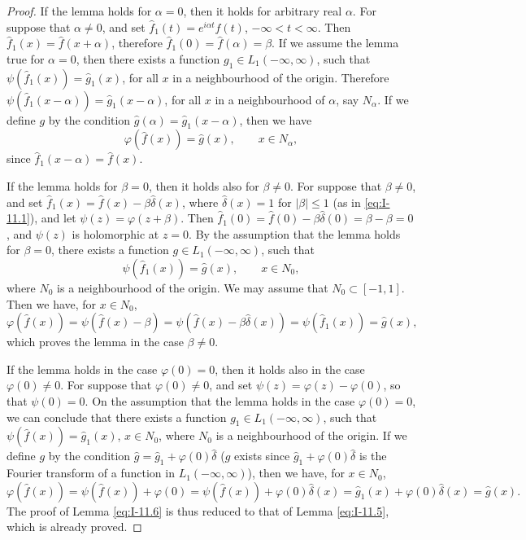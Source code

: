 \begin{proof}
If the lemma holds for $\alpha=0$, then it holds for arbitrary real $\alpha$. For suppose that $\alpha\neq 0$, and set $\widehat f_1(t)=e^{i\alpha t}f(t)$, $-\infty<t<\infty$. Then $\widehat f_1(x)=\widehat f(x+\alpha)$, therefore $\widehat f_1(0)=\widehat f(\alpha)=\beta$. If we assume the lemma true for $\alpha=0$, then there exists a function $g_1\in L_1(-\infty,\infty)$, such that $\psi(\widehat f_1(x))=\widehat g_1(x)$, for all $x$ in a neighbourhood of the origin. Therefore $\psi(\widehat f_1(x-\alpha))=\widehat g_1(x-\alpha)$, for all $x$ in a neighbourhood of $\alpha$, say $N_\alpha$. If we define $g$ by the condition $\widehat g(\alpha)=\widehat g_1(x-\alpha)$, then we have
\begin{equation*}
\varphi(\widehat f(x))=\widehat g(x),\qquad x\in N_\alpha,
\end{equation*}
since $\widehat f_1(x-\alpha)=\widehat f(x)$.

If the lemma holds for $\beta=0$, then it holds also for $\beta\neq 0$. For suppose that $\beta\neq 0$, and set $\widehat f_1(x)=\widehat f(x)-\beta\widehat\delta(x)$, where $\widehat\delta(x)=1$ for $|\beta|\le 1$ (as in \eqref{eq:I-11.1}), and let $\psi(z)=\varphi(z+\beta)$. Then $\widehat f_1(0)=\widehat f(0)-\beta\widehat\delta(0)=\beta-\beta=0$, and $\psi(z)$ is holomorphic at $z=0$. By the assumption that the lemma holds for $\beta=0$, there exists a function $g\in L_1(-\infty,\infty)$, such that
\begin{equation*}
\psi(\widehat f_1(x))=\widehat g(x),\qquad x\in N_0,
\end{equation*}
where $N_0$ is a neighbourhood of the origin. We may assume that $N_0\subset[-1,1]$. Then we have, for $x\in N_0$,
\begin{equation*}
\varphi(\widehat f(x))=\psi(\widehat f(x)-\beta)=\psi(\widehat f(x)-\beta\widehat\delta(x))=\psi(\widehat f_1(x))=\widehat g(x),
\end{equation*}
which proves the lemma in the case $\beta\neq 0$.

If the lemma holds in the case $\varphi(0)=0$, then it holds also in the case $\varphi(0)\neq 0$. For suppose that $\varphi(0)\neq 0$, and set $\psi(z)=\varphi(z)-\varphi(0)$, so that $\psi(0)=0$. On the assumption that the lemma holds in the case $\varphi(0)=0$, we can conclude that there exists a function $g_1\in L_1(-\infty,\infty)$, such that $\psi(\widehat f(x))=\widehat g_1(x)$, $x\in N_0$, where $N_0$ is a neighbourhood of the origin. If we define $g$ by the condition $\widehat g=\widehat g_1+\varphi(0)\widehat\delta$ ($g$ exists since $\widehat g_1+\varphi(0)\widehat\delta$ is the Fourier transform of a function in $L_1(-\infty,\infty)$), then we have, for $x\in N_0$,
\begin{equation*}
\varphi(\widehat f(x))=\psi(\widehat f(x))+\varphi(0)=\psi(\widehat f(x))+\varphi(0)\widehat\delta(x)
=\widehat g_1(x)+\varphi(0)\widehat\delta(x)=\widehat g(x).
\end{equation*}
The proof of Lemma \eqref{eq:I-11.6} is thus reduced to that of Lemma \eqref{eq:I-11.5}, which is already proved.
\end{proof}

